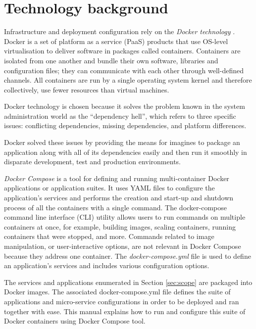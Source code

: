 \section{Technology background}
\label{sec:background}

	Infrastructure and deployment configuration rely on the \textit{Docker technology} \citep{docker-merkel2014docker, docker}. Docker is a set of platform as a service (PaaS) products that use OS-level virtualisation to deliver software in packages called containers. Containers are isolated from one another and bundle their own software, libraries and configuration files; they can communicate with each other through well-defined channels. All containers are run by a single operating system kernel and therefore collectively, use fewer resources than virtual machines.

	Docker technology is chosen because it solves the problem known in the system administration world as the ``dependency hell'', which refers to three specific issues: conflicting dependencies, missing dependencies, and platform differences.

	Docker solved these issues by providing the means for imagines to package an application along with all of its dependencies easily and then run it smoothly in disparate development, test and production
environments.
		
	\textit{Docker Compose} is a tool for defining and running multi-container Docker applications or application suites. It uses YAML files to configure the application's services and performs the creation and start-up and shutdown process of all the containers with a single command. The docker-compose command line interface (CLI) utility allows users to run commands on multiple containers at once, for example, building images, scaling containers, running containers that were stopped, and more. Commands related to image manipulation, or user-interactive options, are not relevant in Docker Compose because they address one container. The \textit{docker-compose.yml} file is used to define an application's services and includes various configuration options.

	The services and applications enumerated in Section \ref{sec:scope} are packaged into Docker images. The associated docker-compose.yml file defines the suite of applications and micro-service configurations in order to be deployed and ran together with ease. This manual explains how to run and configure this suite of Docker containers using Docker Compose tool.